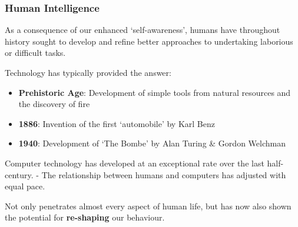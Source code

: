 \documentclass[10pt, compress]{beamer}
\begin{document}
%  
%  
%    
%    
%    
%    
%     
%     
%

\begin{frame}[fragile]
  \frametitle{Human Intelligence}
  
   \small{ 
   
   As a consequence of our enhanced `self-awareness', humans have throughout history sought to develop and refine better approaches to undertaking laborious or difficult tasks.
    
    Technology has typically provided the answer:
    
    \begin{itemize}
    	\item \textbf{Prehistoric Age}: Development of simple tools from natural resources and the discovery of fire
    	\item \textbf{1886}: Invention of the first `automobile' by Karl Benz
    	\item \textbf{1940}: Development of `The Bombe' by Alan Turing \& Gordon Welchman
    \end{itemize}
    
    Computer technology has developed at an exceptional rate over the last half-century. - The relationship between humans and computers has adjusted with equal pace.
    

Not only penetrates almost every aspect of human life, but has now also shown the potential for \textbf{re-shaping} our behaviour. 
     
     }

\end{frame}
\end{document}
